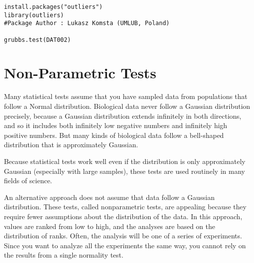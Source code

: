 \begin{framed}
\begin{verbatim}
install.packages("outliers")
library(outliers)
#Package Author : Lukasz Komsta (UMLUB, Poland)

grubbs.test(DAT002)
\end{verbatim}
\end{framed}



\section{Non-Parametric Tests}
Many statistical tests assume that you have sampled data from populations that follow a Normal distribution. 
Biological data never follow a Gaussian distribution precisely, because a Gaussian distribution extends infinitely in both directions, and so it includes both infinitely low negative numbers and infinitely high positive numbers. But many kinds of biological data follow a bell-shaped distribution that is approximately Gaussian. 

Because statistical tests work well even if the distribution is only approximately Gaussian (especially with large samples), these tests are used routinely in many fields of science.

An alternative approach does not assume that data follow a Gaussian distribution. These tests, called nonparametric tests, are appealing because they require fewer assumptions about the distribution of the data. In this approach, values are ranked from low to high, and the analyses are based on the distribution of ranks.
Often, the analysis will be one of a series of experiments. Since you want to analyze all the experiments the same way, you cannot rely on the results from a single normality test.
